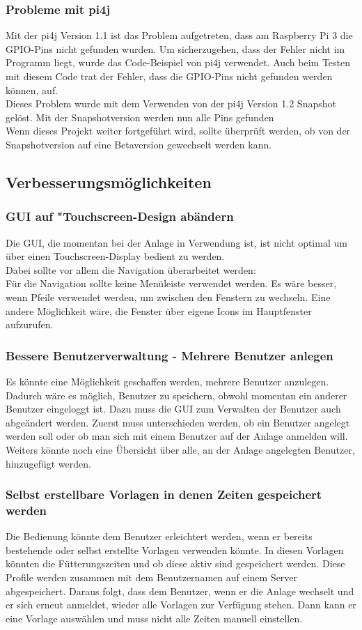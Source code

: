 \subsubsection{Probleme mit pi4j}
Mit der \ac{pi4j} Version 1.1 ist das Problem aufgetreten, dass am Raspberry Pi 3 die \ac{GPIO}-Pins nicht gefunden wurden. Um sicherzugehen, dass der Fehler nicht im Programm liegt, wurde das Code-Beispiel von \ac{pi4j} verwendet. Auch beim Testen mit diesem Code trat der Fehler, dass die \ac{GPIO}-Pins nicht gefunden werden können, auf.
\\ Dieses Problem wurde mit dem Verwenden von der \ac{pi4j} Version 1.2 Snapshot gelöst. Mit der Snapshotversion werden nun alle Pins gefunden
\\ Wenn dieses Projekt weiter fortgeführt wird, sollte überprüft werden, ob von der Snapshotversion auf eine Betaversion gewechselt werden kann.

\subsection{Verbesserungsmöglichkeiten}
\subsubsection{GUI auf "Touchscreen-Design\grqq{} abändern}
Die \ac{GUI}, die momentan bei der Anlage in Verwendung ist, ist nicht optimal um über einen Touchscreen-Display bedient zu werden.
\\ Dabei sollte vor allem die Navigation überarbeitet werden: 
\\Für die Navigation sollte keine Menüleiste verwendet werden. Es wäre besser, wenn Pfeile verwendet werden, um zwischen den Fenstern zu wechseln. Eine andere Möglichkeit wäre, die Fenster über eigene Icons im Hauptfenster aufzurufen.
\subsubsection{Bessere Benutzerverwaltung - Mehrere Benutzer anlegen}
Es könnte eine Möglichkeit geschaffen werden, mehrere Benutzer anzulegen. Dadurch wäre es möglich, Benutzer zu speichern, obwohl momentan ein anderer Benutzer eingeloggt ist. Dazu muss die \ac{GUI} zum Verwalten der Benutzer auch abgeändert werden. Zuerst muss unterschieden werden, ob ein Benutzer angelegt werden soll oder ob man sich mit einem Benutzer auf der Anlage anmelden will. Weiters könnte noch eine Übersicht über alle, an der Anlage angelegten Benutzer, hinzugefügt werden.
\subsubsection{Selbst erstellbare Vorlagen in denen Zeiten gespeichert werden}
Die Bedienung könnte dem Benutzer erleichtert werden, wenn er bereits bestehende oder selbst erstellte Vorlagen verwenden könnte. In diesen Vorlagen könnten die Fütterungszeiten und ob diese aktiv sind gespeichert werden. Diese Profile werden zusammen mit dem Benutzernamen auf einem Server abgespeichert. Daraus folgt, dass dem Benutzer, wenn er die Anlage wechselt und er sich erneut anmeldet, wieder alle Vorlagen zur Verfügung stehen. Dann kann er eine Vorlage auswählen und muss nicht alle Zeiten manuell einstellen.

